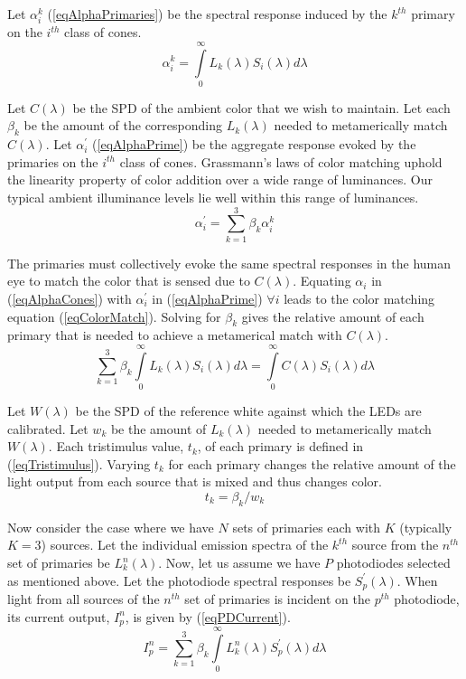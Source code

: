 Let $\alpha_{i}^{k}$ (\ref{eqAlphaPrimaries}) be the spectral response induced by the $k^{th}$ primary on the $i^{th}$ class of cones.
\begin{equation}
	\label{eqAlphaPrimaries}
	\alpha_{i}^{k} = \int\limits_{0}^{\infty} L_{k}(\lambda)S_{i}(\lambda)d\lambda
\end{equation}

Let $C(\lambda)$ be the SPD of the ambient color that we wish to maintain. Let each $\beta_{k}$ be the amount of the corresponding $L_{k}(\lambda)$ needed to metamerically match $C(\lambda)$. Let $\alpha_{i}^{'}$ (\ref{eqAlphaPrime}) be the aggregate response evoked by the primaries on the $i^{th}$ class of cones. Grassmann's laws of color matching uphold the linearity property of color addition over a wide range of luminances. Our typical ambient illuminance levels lie well within this range of luminances.
\begin{equation}
	\label{eqAlphaPrime}
	\alpha_{i}^{'} = \sum\limits_{k=1}^{3} \beta_{k}\alpha_{i}^{k}
\end{equation}

The primaries must collectively evoke the same spectral responses in the human eye to match the color that is sensed due to $C(\lambda)$. Equating $\alpha_{i}$ in (\ref{eqAlphaCones}) with $\alpha_{i}^{'}$ in (\ref{eqAlphaPrime}) $\forall i$ leads to the color matching equation (\ref{eqColorMatch}). Solving for $\beta_{k}$ gives the relative amount of each primary that is needed to achieve a metamerical match with $C(\lambda)$.
\begin{equation}
	\label{eqColorMatch}
	\sum\limits_{k=1}^{3} \beta_{k}\int\limits_{0}^{\infty} L_{k}(\lambda)S_{i}(\lambda)d\lambda = \int\limits_{0}^{\infty} C(\lambda)S_{i}(\lambda)d\lambda
\end{equation}

Let $W(\lambda)$ be the SPD of the reference white against which the LEDs are calibrated. Let $w_{k}$ be the amount of $L_{k}(\lambda)$ needed to metamerically match $W(\lambda)$. Each tristimulus value, $t_{k}$, of each primary is defined in (\ref{eqTristimulus}). Varying $t_{k}$ for each primary changes the relative amount of the light output from each source that is mixed and thus changes color.
\begin{equation}
	\label{eqTristimulus}
	t_{k} = \beta_{k}/ w_{k}
\end{equation}

Now consider the case where we have $N$ sets of primaries each with $K$ (typically $K=3$) sources. Let the individual emission spectra of the $k^{th}$ source from the $n^{th}$ set of primaries be  $L_{k}^{n}(\lambda)$. Now, let us assume we have $P$ photodiodes  selected as mentioned above. Let the photodiode spectral responses be $S_{p}^{'}(\lambda)$. When light from all sources of the $n^{th}$ set of primaries is incident on the $p^{th}$ photodiode, its current output, $I_{p}^{n}$, is given by (\ref{eqPDCurrent}). 
\begin{equation}
	\label{eqPDCurrent}
	I_{p}^{n} = \sum\limits_{k=1}^{3} \beta_{k}\int\limits_{0}^{\infty} L_{k}^{n}(\lambda)S_{p}^{'}(\lambda)d\lambda
\end{equation}

